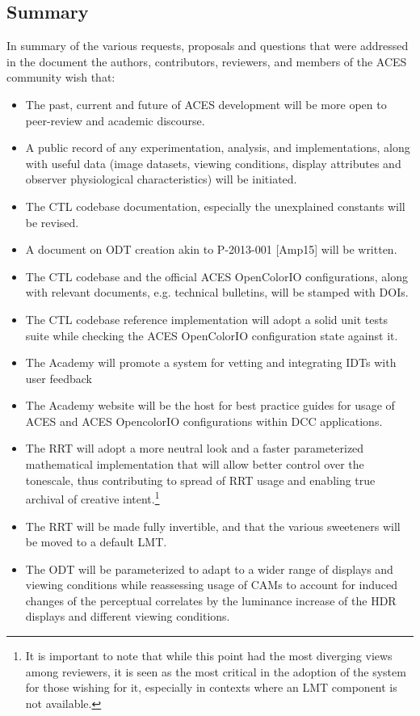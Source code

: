\documentclass[conference]{IEEEtran}
\begin{document}
\subsection{Summary}
In summary of the various requests, proposals and questions that were addressed in the document the authors, contributors, reviewers, and members of the ACES community wish that:
\begin{itemize}
	\item The past, current and future of ACES development will be more open to peer-review and academic discourse.
	\item A public record of any experimentation, analysis, and implementations, along with useful data (image datasets, viewing conditions, display attributes and observer physiological characteristics) will be initiated.
	\item The CTL codebase documentation, especially the unexplained constants will be revised.
	\item A document on ODT creation akin to P-2013-001 [Amp15] will be written.
	\item The CTL codebase and the official ACES OpenColorIO configurations, along with relevant documents, e.g. technical bulletins, will be stamped with DOIs.
	\item The CTL codebase reference implementation will adopt a solid unit tests suite while checking the ACES OpenColorIO configuration state against it.
	\item The Academy will promote a system for vetting and integrating IDTs with user feedback
	\item The Academy website will be the host for best practice guides for usage of ACES and ACES OpencolorIO configurations within DCC applications.
	\item The RRT will adopt a more neutral look and a faster parameterized mathematical implementation that will allow better control over the tonescale, thus contributing to spread of RRT usage and enabling true archival of creative intent.\footnote{It is important to note that while this point had the most diverging views among reviewers, it is seen as the most critical in the adoption of the system for those wishing for it, especially in contexts where an LMT component is not available.}
	\item The RRT will be made fully invertible, and that the various sweeteners will be moved to a default LMT.
	\item The ODT will be parameterized to adapt to a wider range of displays and viewing conditions while reassessing usage of CAMs to account for induced changes of the perceptual correlates by the luminance increase of the HDR displays and different viewing conditions.

\end{itemize}
\end{document}
